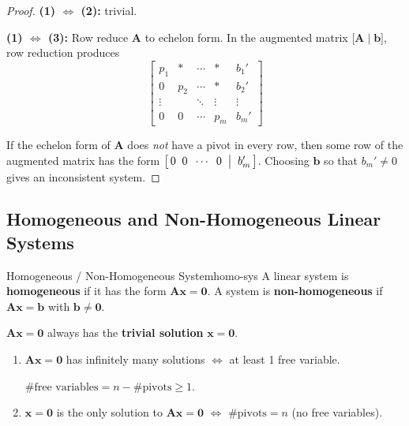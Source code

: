 \begin{proof}

  \textbf{(1) $\Leftrightarrow$ (2):} trivial.

  \textbf{(1) $\Leftrightarrow$ (3):} Row reduce $\mathbf{A}$ to echelon form. In the augmented matrix $\bigl[\mathbf{A} \mid \mathbf{b}\bigr]$, row reduction produces
  \[
    \left[
      \begin{array}{cccc|c}
        p_1    & *   & \cdots & *      & b_1'   \\
        0      & p_2 & \cdots & *      & b_2'   \\
        \vdots &     & \ddots & \vdots & \vdots \\
        0      & 0   & \cdots & p_m    & b_m'
      \end{array}
      \right]
  \]

  If the echelon form of $\mathbf{A}$ does \emph{not} have a pivot in every row, then some row of the augmented matrix has the form $\bigl[\,0 \;\; 0 \;\; \cdots \;\; 0 \;\bigm|\; b_m'\,\bigr]$. Choosing $\mathbf{b}$ so that $b_m' \neq 0$ gives an inconsistent system.
\end{proof}

\subsection{Homogeneous and Non-Homogeneous Linear Systems}

\begin{definition}{Homogeneous / Non-Homogeneous System}{homo-sys}
  A linear system is \textbf{homogeneous} if it has the form $\mathbf{A}\mathbf{x} = \mathbf{0}$.
  A system is \textbf{non-homogeneous} if $\mathbf{A}\mathbf{x} = \mathbf{b}$ with $\mathbf{b} \neq \mathbf{0}$.
\end{definition}

\begin{note}
  $\mathbf{A}\mathbf{x} = \mathbf{0}$ always has the \textbf{trivial solution} $\mathbf{x} = \mathbf{0}$.
\end{note}

\begin{enumerate}
  \item $\mathbf{A}\mathbf{x} = \mathbf{0}$ has infinitely many solutions $\iff$ at least 1 free variable.
        \begin{remark}
          $\#\text{free variables} = n - \#\text{pivots} \geq 1$.
        \end{remark}

  \item $\mathbf{x} = \mathbf{0}$ is the only solution to $\mathbf{A}\mathbf{x} = \mathbf{0}$ $\iff$ $\#\text{pivots} = n$ (no free variables).
\end{enumerate}

